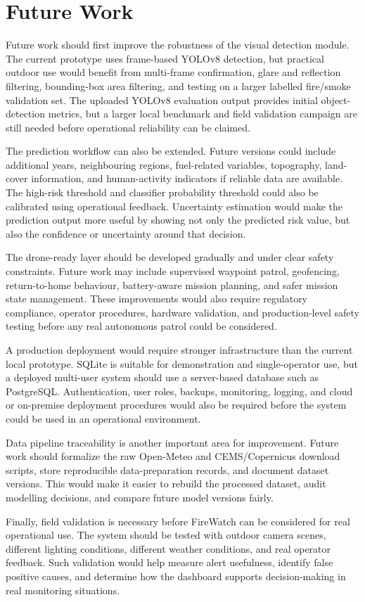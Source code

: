 \section{Future Work}

Future work should first improve the robustness of the visual detection
module. The current prototype uses frame-based YOLOv8 detection, but practical
outdoor use would benefit from multi-frame confirmation, glare and reflection
filtering, bounding-box area filtering, and testing on a larger labelled
fire/smoke validation set. The uploaded YOLOv8 evaluation output provides
initial object-detection metrics, but a larger local benchmark and field
validation campaign are still needed before operational reliability can be
claimed.

The prediction workflow can also be extended. Future versions could include
additional years, neighbouring regions, fuel-related variables, topography,
land-cover information, and human-activity indicators if reliable data are
available. The high-risk threshold and classifier probability threshold could
also be calibrated using operational feedback. Uncertainty estimation would
make the prediction output more useful by showing not only the predicted risk
value, but also the confidence or uncertainty around that decision.

The drone-ready layer should be developed gradually and under clear safety
constraints. Future work may include supervised waypoint patrol, geofencing,
return-to-home behaviour, battery-aware mission planning, and safer mission
state management. These improvements would also require regulatory
compliance, operator procedures, hardware validation, and production-level
safety testing before any real autonomous patrol could be considered.

A production deployment would require stronger infrastructure than the current
local prototype. SQLite is suitable for demonstration and single-operator use,
but a deployed multi-user system should use a server-based database such as
PostgreSQL. Authentication, user roles, backups, monitoring, logging, and
cloud or on-premise deployment procedures would also be required before the
system could be used in an operational environment.

Data pipeline traceability is another important area for improvement. Future
work should formalize the raw Open-Meteo and CEMS/Copernicus download scripts,
store reproducible data-preparation records, and document dataset versions.
This would make it easier to rebuild the processed dataset, audit modelling
decisions, and compare future model versions fairly.

Finally, field validation is necessary before FireWatch can be considered for
real operational use. The system should be tested with outdoor camera scenes,
different lighting conditions, different weather conditions, and real operator
feedback. Such validation would help measure alert usefulness, identify false
positive causes, and determine how the dashboard supports decision-making in
real monitoring situations.

